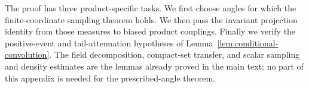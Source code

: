 The proof has three product-specific tasks.  We first choose angles for
which the finite-coordinate sampling theorem holds.  We then pass the invariant
projection identity from those measures to biased product couplings.
Finally we verify the positive-event and tail-attenuation hypotheses of
Lemma~\ref{lem:conditional-convolution}.  The field decomposition,
compact-set transfer, and scalar sampling and density estimates are the
lemmas already proved in the main text; no part of this appendix is
needed for the prescribed-angle theorem.







